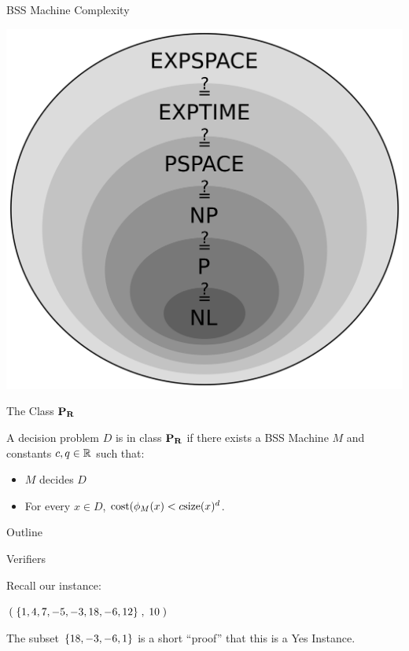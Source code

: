 \documentclass[c]{beamer}
\begin{document}
\begin{frame}{BSS Machine Complexity}
  \begin{center}
    \includegraphics[width=\textwidth]{media/complexity.png}
  \end{center}
\end{frame}

\begin{frame}{The Class $\mathbf{P_R}$}
  
  A decision problem $D$ is in class $\mathbf{P_R}$ if there exists a BSS
  Machine $M$ and constants $c, q \in \mathbb{R}$ such that:
  \begin{itemize}
  \item $M$ decides $D$
  \item For every $x \in D$, $\text{cost}(\phi_M(x) < c \text{size}(x)^d$.
  \end{itemize}
  
\end{frame}

\begin{frame}{Outline}
  \begin{center}
    \scaletopagewidth{\outlinefinal}
  \end{center}
\end{frame}

\begin{frame}{Verifiers}

  Recall our \subsum{} instance:

  \vspace{\baselineskip}

  $(\;\{1,4,7,-5,-3,18,-6,12\}\;, \;10\;)$

  \vspace{\baselineskip}

  The subset $\{18, -3, -6, 1\}$ is a short ``proof'' that this is a
  Yes Instance.

  \vspace{\baselineskip}

\end{frame}
\end{document}
